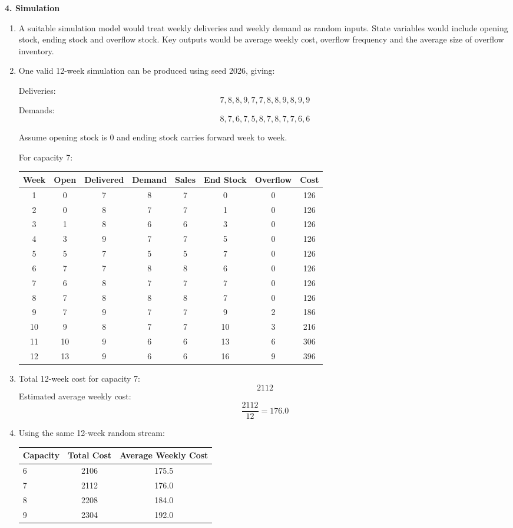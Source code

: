 \documentclass[11pt,a4paper]{article}
\begin{document}
\textbf{4. Simulation}

\begin{enumerate}
\item A suitable simulation model would treat weekly deliveries and weekly demand as random inputs. State variables would include opening stock, ending stock and overflow stock. Key outputs would be average weekly cost, overflow frequency and the average size of overflow inventory.

\item One valid 12-week simulation can be produced using seed 2026, giving:

Deliveries:
\[
7,8,8,9,7,7,8,8,9,8,9,9
\]
Demands:
\[
8,7,6,7,5,8,7,8,7,7,6,6
\]

Assume opening stock is 0 and ending stock carries forward week to week.

For capacity 7:

\begin{center}
\begin{tabular}{cccccccc}
\toprule
Week & Open & Delivered & Demand & Sales & End Stock & Overflow & Cost \\
\midrule
1 & 0 & 7 & 8 & 7 & 0 & 0 & 126 \\
2 & 0 & 8 & 7 & 7 & 1 & 0 & 126 \\
3 & 1 & 8 & 6 & 6 & 3 & 0 & 126 \\
4 & 3 & 9 & 7 & 7 & 5 & 0 & 126 \\
5 & 5 & 7 & 5 & 5 & 7 & 0 & 126 \\
6 & 7 & 7 & 8 & 8 & 6 & 0 & 126 \\
7 & 6 & 8 & 7 & 7 & 7 & 0 & 126 \\
8 & 7 & 8 & 8 & 8 & 7 & 0 & 126 \\
9 & 7 & 9 & 7 & 7 & 9 & 2 & 186 \\
10 & 9 & 8 & 7 & 7 & 10 & 3 & 216 \\
11 & 10 & 9 & 6 & 6 & 13 & 6 & 306 \\
12 & 13 & 9 & 6 & 6 & 16 & 9 & 396 \\
\bottomrule
\end{tabular}
\end{center}

\item Total 12-week cost for capacity 7:
\[
2112
\]
Estimated average weekly cost:
\[
\frac{2112}{12}=176.0
\]

\item Using the same 12-week random stream:

\begin{center}
\begin{tabular}{lcc}
\toprule
Capacity & Total Cost & Average Weekly Cost \\
\midrule
6 & 2106 & 175.5 \\
7 & 2112 & 176.0 \\
8 & 2208 & 184.0 \\
9 & 2304 & 192.0 \\
\bottomrule
\end{tabular}
\end{center}


\end{enumerate}
\end{document}
